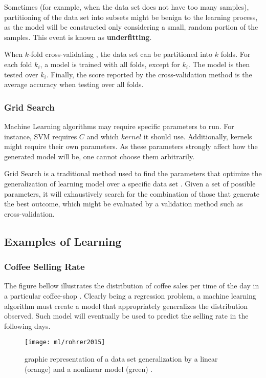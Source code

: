 Sometimes (for example, when the data set does not have too many samples), partitioning of the data set into subsets might be benign to the learning process, as the model will be constructed only considering a small, random portion of the samples. This event is known as \textbf{underfitting}.

When $k$-fold cross-validating \cite{crossvalid}, the data set can be partitioned into $k$ folds. For each fold $k_i$, a model is trained with all folds, except for $k_i$. The model is then tested over $k_i$. Finally, the score reported by the cross-validation method is the average accuracy when testing over all folds.

\subsubsection{Grid Search}

Machine Learning algorithms may require specific parameters to run. For instance, SVM requires $C$ and which $kernel$ it should use. Additionally, kernels might require their own parameters. As these parameters strongly affect how the generated model will be, one cannot choose them arbitrarily.

Grid Search is a traditional method used to find the parameters that optimize the generalization of learning model over a specific data set \cite{gridsearch}. Given a set of possible parameters, it will exhaustively search for the combination of those that generate the best outcome, which might be evaluated by a validation method such as cross-validation.

\subsection{Examples of Learning}

\subsubsection{Coffee Selling Rate}

The figure bellow illustrates the distribution of coffee sales per time of the day in a particular coffee-shop \cite{roh2015}. Clearly being a regression problem, a machine learning algorithm must create a model that appropriately generalizes the distribution observed. Such model will eventually be used to predict the selling rate in the following days.

\begin{figure}[H]
	\centering
	\captionsetup{justification=centering}

	\texttt{[image: ml/rohrer2015]}
	\caption{graphic representation of a data set generalization by a linear (orange) and a nonlinear model (green) \cite{roh2015}.}
	\label{fig:rohrer2015}
\end{figure}

